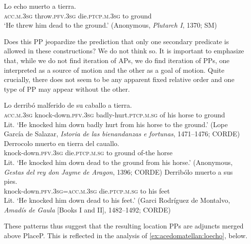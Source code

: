 \documentclass[output=paper,colorlinks,citecolor=brown,
]{langscibook}
\begin{document}
\ea\label{ex:acedomatellan:loecho}
  \gll Lo echo muerto a 	tierra. \\
\textsc{acc}.\textsc{m}.\textsc{3sg} throw.\textsc{pfv}.\textsc{3sg} die.\textsc{ptcp}.\textsc{m}.\textsc{3sg} 	to 	ground\\
  \glt `He threw him dead to the ground.’ (Anonymous, \textit{Plutarch I}, 1370; SM)
\z 

Does this PP jeopardize the prediction that only one secondary predicate is allowed in these constructions? We do not think so. It is important to emphasize that, while we do not find iteration of APs, we do find iteration of PPs, one interpreted as a source of motion and the other as a goal of motion. Quite crucially, there does not seem to be any  apparent fixed relative order and one type of PP may appear without the other.

\ea
  \ea
    \gll Lo derribó malferido de 	su 	caballo 	a 	tierra.\\
\textsc{acc}.\textsc{m}.\textsc{3sg} 	knock-down.\textsc{pfv}.\textsc{3sg} 		badly-hurt.\textsc{ptcp}.\textsc{m}.\textsc{sg} 	of 		his horse			to 	ground\\
    \glt Lit. `He knocked him down badly hurt from his horse to the ground.’ (Lope García de Salazar, \textit{Istoria de las bienandanzas e fortunas}, 1471--1476; CORDE)
  \ex
    \gll Derrocolo 	muerto en 	tierra 	del cauallo.\\
knock-down.\textsc{pfv}.\textsc{3sg} 	die.\textsc{ptcp}.\textsc{m}.\textsc{sg} 	to 		ground 	of-the 	horse\\
    \glt Lit. `He knocked him down dead to the ground from his horse.’ (Anonymous, \textit{Gestas del rey don Jayme de Aragon}, 1396; CORDE)
  \ex
    \gll Derribólo muerto 	a 	sus 	pies.\\
knock-down.\textsc{pfv}.\textsc{3sg}=\textsc{acc}.\textsc{m}.\textsc{3sg}	die.\textsc{ptcp}.\textsc{m}.\textsc{sg}	to	his 	feet\\
    \glt Lit. `He knocked him down dead to his feet.’ (Garci Rodríguez de Montalvo, \textit{Amadís de Gaula} [Books I and II], 1482--1492; CORDE)
  \z 
\z 


These patterns thus suggest that the resulting location PPs are adjuncts merged above PlaceP. This is reflected in the analysis of \ref{ex:acedomatellan:loecho}, below.
\end{document}
